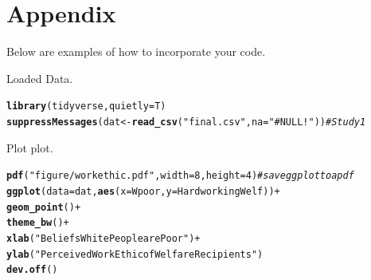 \documentclass{article}\usepackage[]{graphicx}\usepackage[]{color}
\makeatletter
\newcommand{\hlnum}[1]{\textcolor[rgb]{0.686,0.059,0.569}{#1}}%
\newcommand{\hlstr}[1]{\textcolor[rgb]{0.192,0.494,0.8}{#1}}%
\newcommand{\hlcom}[1]{\textcolor[rgb]{0.678,0.584,0.686}{\textit{#1}}}%
\newcommand{\hlopt}[1]{\textcolor[rgb]{0,0,0}{#1}}%
\newcommand{\hlstd}[1]{\textcolor[rgb]{0.345,0.345,0.345}{#1}}%
\newcommand{\hlkwb}[1]{\textcolor[rgb]{0.69,0.353,0.396}{#1}}%
\newcommand{\hlkwc}[1]{\textcolor[rgb]{0.333,0.667,0.333}{#1}}%
\newcommand{\hlkwd}[1]{\textcolor[rgb]{0.737,0.353,0.396}{\textbf{#1}}}%
\newenvironment{kframe}{%
 \def\at@end@of@kframe{}%
 \ifinner\ifhmode%
  \def\at@end@of@kframe{\end{minipage}}%
  \begin{minipage}{\columnwidth}%
 \fi\fi%
 \def\FrameCommand##1{\hskip\@totalleftmargin \hskip-\fboxsep
 \colorbox{shadecolor}{##1}\hskip-\fboxsep
     \hskip-\linewidth \hskip-\@totalleftmargin \hskip\columnwidth}%
 \MakeFramed {\advance\hsize-\width
   \@totalleftmargin\z@ \linewidth\hsize
   \@setminipage}}%
 {\par\unskip\endMakeFramed%
 \at@end@of@kframe}
\newenvironment{knitrout}{}{} %
\makeatother
\begin{document}
\begin{multicols}{2}
\newpage

\end{multicols}

\newpage
\onecolumn
\section{Appendix}
\begin{scriptsize}
Below are examples of how to incorporate your code.\\\vspace{1em}

Loaded Data.
\begin{knitrout}
\color{fgcolor}\begin{kframe}
\begin{alltt}
\hlkwd{library}\hlstd{(tidyverse,}\hlkwc{quietly} \hlstd{= T)}
\hlkwd{suppressMessages}\hlstd{(dat} \hlkwb{<-} \hlkwd{read_csv}\hlstd{(}\hlstr{"final.csv"}\hlstd{,} \hlkwc{na}\hlstd{=}\hlstr{"#NULL!"}\hlstd{))} \hlcom{# Study 1}
\end{alltt}
\end{kframe}
\end{knitrout}
Plot plot.
\begin{knitrout}
\color{fgcolor}\begin{kframe}
\begin{alltt}
\hlkwd{pdf}\hlstd{(}\hlstr{"figure/workethic.pdf"}\hlstd{,}\hlkwc{width}\hlstd{=}\hlnum{8}\hlstd{,} \hlkwc{height}\hlstd{=}\hlnum{4}\hlstd{)}  \hlcom{#save ggplot to a pdf}
\hlkwd{ggplot}\hlstd{(}\hlkwc{data}\hlstd{=dat,}\hlkwd{aes}\hlstd{(}\hlkwc{x}\hlstd{=Wpoor,} \hlkwc{y}\hlstd{=HardworkingWelf))}\hlopt{+}
  \hlkwd{geom_point}\hlstd{()}\hlopt{+}
  \hlkwd{theme_bw}\hlstd{()}\hlopt{+}
  \hlkwd{xlab}\hlstd{(}\hlstr{"Beliefs White People are Poor"}\hlstd{)}\hlopt{+}
  \hlkwd{ylab}\hlstd{(}\hlstr{"Perceived Work Ethic of Welfare Recipients"}\hlstd{)}
\hlkwd{dev.off}\hlstd{()}
\end{alltt}
\end{kframe}
\end{knitrout}

\end{scriptsize}
\end{document}
